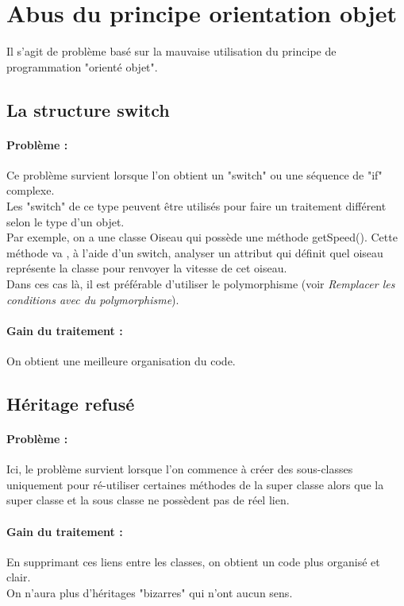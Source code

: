 \documentclass[a4paper,twoside,12pt,openright]{report}
\begin{document}
\section{Abus du principe orientation objet}
Il s'agit de problème basé sur la mauvaise utilisation du principe de programmation "orienté objet".\\

\subsection{La structure switch}
\paragraph{Problème :}
Ce problème survient lorsque l'on obtient un "switch" ou une séquence de "if" complexe.\\
Les "switch" de ce type peuvent être utilisés pour faire un traitement différent selon le type d'un objet.\\
Par exemple, on a une classe Oiseau qui possède une méthode getSpeed(). Cette méthode va , à l'aide d'un switch, analyser un attribut qui définit quel oiseau représente la classe pour renvoyer la vitesse de cet oiseau.\\
Dans ces cas là, il est préférable d'utiliser le polymorphisme (voir \textit{Remplacer les conditions avec du polymorphisme}).

\paragraph{Gain du traitement :}
On obtient une meilleure organisation du code.\\

\subsection{Héritage refusé}
\paragraph{Problème :}
Ici, le problème survient lorsque l'on commence à créer des sous-classes uniquement pour ré-utiliser certaines méthodes de la super classe alors que la super classe et la sous classe ne possèdent pas de réel lien.\\


\paragraph{Gain du traitement :}
En supprimant ces liens entre les classes, on obtient  un code plus organisé et clair.\\
On n'aura plus d'héritages "bizarres" qui n'ont aucun sens.\\
\end{document}
